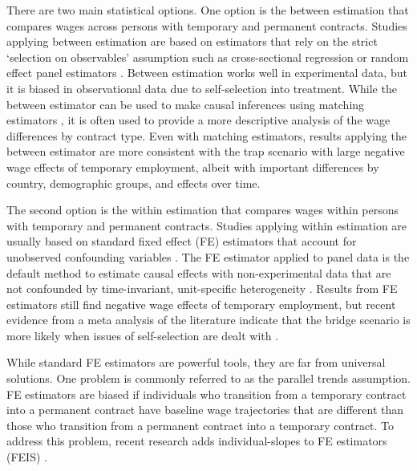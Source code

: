 \documentclass[12pt]{article}
\begin{document}
There are two main statistical options. One option is the between estimation that compares wages across persons with temporary and permanent contracts.  Studies applying between estimation are based on estimators that rely on the strict `selection on observables' assumption such as cross-sectional regression \citep{arranz_wage_2021,westhoff_wage_2022,comi_are_2012} or random effect panel estimators \citep{giesecke_external_2004}.  Between estimation works well in experimental data, but it is biased in observational data due to self-selection into treatment.  While the between estimator can be used to make causal inferences using matching estimators \citep{gash_fixed-term_2007,gebel_early_2010}, it is often used to provide a more descriptive analysis of the wage differences by contract type.  Even with matching estimators, results applying the between estimator are more consistent with the trap scenario with large negative wage effects of temporary employment, albeit with important differences by country, demographic groups, and effects over time.  

The second option is the within estimation that compares wages within persons with temporary and permanent contracts.  Studies applying within estimation are usually based on standard fixed effect (FE) estimators that account for unobserved confounding variables \citep{booth_temporary_2002,mertens_wages_2004}.  The FE estimator applied to panel data is the default method to estimate causal effects with non-experimental data that are not confounded by time-invariant, unit-specific heterogeneity \citep{imai2021use}.  Results from FE estimators still find negative wage effects of temporary employment, but recent evidence from a meta analysis of the literature indicate that the bridge scenario is more likely when issues of self-selection are dealt with \citep{filomena_picchio_2022}.

While standard FE estimators are powerful tools, they are far from universal solutions.  One problem is commonly referred to as the parallel trends assumption.  FE estimators are biased if individuals who transition from a temporary contract into a permanent contract have baseline wage trajectories that are different than those who transition from a permanent contract into a temporary contract.  To address this problem, recent research adds individual-slopes to FE estimators (FEIS) \citep{ludwig_is_2018}.  

\end{document}
